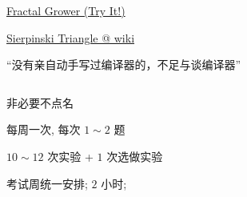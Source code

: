 \begin{frame}{}
  \begin{center}

    \vspace{0.30cm}
    \href{https://www.cs.unm.edu/~joel/PaperFoldingFractal/paper.html}{Fractal Grower (Try It!)}

    \vspace{0.30cm}
    \href{https://en.wikipedia.org/wiki/Sierpi\%C5\%84ski\_triangle}{Sierpinski Triangle @ wiki}
  \end{center}
\end{frame}


\begin{frame}{}
  \begin{center}

    \vspace{0.50cm}
    ``没有亲自动手写过编译器的，不足与谈编译器''
  \end{center}
\end{frame}

\begin{frame}{}
  \begin{columns}
      \begin{description}[<+->]
        \setlength{\itemsep}{25pt}
        \item[\blue{\bf 考勤 ($00\%$):}] 非必要不点名
        \item[\cyan{\bf 平时作业 ($00\%$):}] 每周一次, 每次 $1 \sim 2$ 题
        \item[\red{\bf 课程实验 ($75\%$):}] $10 \sim 12$ 次实验 + $1$ 次选做实验 
        \item[\red{\bf 期末测试 ($25\%$):}] 考试周统一安排; $2$ 小时; 
      \end{description}
  \end{columns}
\end{frame}

